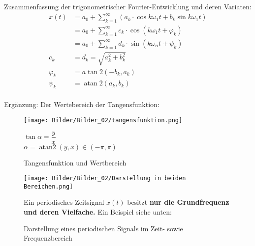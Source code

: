 Zusammenfassung der trigonometrischer Fourier-Entwicklung und deren Variaten:\\
\begin{equation}
\begin{aligned}
    x(t) &=a_{0}+\sum_{k=1}^{\infty}\left(a_{k} \cdot \cos k \omega_{1} t+b_{k} \sin k \omega_{1} t\right) \\
    &=a_{0}+\sum_{k=1}^{\infty} c_{k} \cdot \cos \left(k \omega_{1} t+\varphi_{k}\right) \\
    &=a_{0}+\sum_{k=1}^{\infty} d_{k} \cdot \sin \left(k \omega_{n} t+\psi_{k}\right) \\
    c_{k} &=d_{k}=\sqrt{a_{k}^{2}+b_{k}^{2}}\\
    \varphi_{k} & =a \tan 2\left(-b_{k} , a_{k}\right) \\
    \psi_{k}&=\operatorname{atan} 2\left(a_{k}, b_{k}\right)\\
\end{aligned}
\end{equation}

Ergänzung: Der Wertebereich der Tangensfunktion:\\
\begin{figure}
    \centering
    \begin{minipage}{.45\linewidth}
        \centering
        \texttt{[image: Bilder/Bilder\_02/tangensfunktion.png]}
        \nonumber
    \end{minipage}
    \hspace{1cm}
    \begin{minipage}{.45\linewidth}
        $\tan \alpha=\dfrac{y}{x}$\\
        $\alpha = \operatorname{atan2}(y,x)\in (-\pi,\pi)$
    \end{minipage}
    \caption{Tangensfunktion und Wertbereich}
\end{figure}

\begin{figure}
    \centering
    \begin{minipage}{.7\linewidth}
        \centering
        \texttt{[image: Bilder/Bilder\_02/Darstellung in beiden Bereichen.png]}
        \caption{Darstellung eines periodischen Signals im Zeit- sowie Frequenzbereich}
    \end{minipage}
    \begin{minipage}{.25\linewidth}
        Ein periodisches Zeitsignal $x(t)$ besitzt \textbf{nur die Grundfrequenz und deren Vielfache.} Ein Beispiel siehe unten:
    \end{minipage}
\end{figure}

